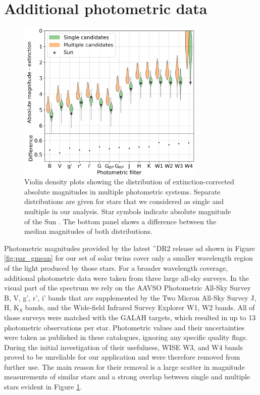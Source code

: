 \section{Additional photometric data}
\label{sec:data_triples}

\begin{figure}
	\centering
	\includegraphics[width=0.8\textwidth]{multimagplotebvc307.png}
	\caption{Violin density plots showing the distribution of extinction-corrected absolute magnitudes in multiple photometric systems. Separate distributions are given for stars that we considered as single and multiple in our analysis. Star symbols indicate absolute magnitude of the Sun \citep{2018ApJS..236...47W}. The bottom panel shows a difference between the median magnitudes of both distributions.}
	\label{fig:viol_photometry}
\end{figure}

Photometric magnitudes provided by the latest \G\ DR2 release \citep{2016A&A...595A...1G, 2018arXiv180409365G} ad shown in Figure \ref{fig:par_gmean} for our set of solar twins cover only a smaller wavelength region of the light produced by those stars. For a broader wavelength coverage, additional photometric data were taken from three large all-sky surveys. In the visual part of the spectrum we rely on the AAVSO Photometric All-Sky Survey \citep[APASS,][]{2015AAS...22533616H} B, V, g', r', i' bands that are supplemented by the Two Micron All-Sky Survey \citep[2MASS,][]{2006AJ....131.1163S} J, H, K$_S$ bands, and the Wide-field Infrared Survey Explorer \citep[WISE,][]{2010AJ....140.1868W} W1, W2 bands. All of those surveys were matched with the GALAH targets, which resulted in up to 13 photometric observations per star. Photometric values and their uncertainties were taken as published in these catalogues, ignoring any specific quality flags. During the initial investigation of their usefulness, WISE W3, and W4 bands proved to be unreliable for our application and were therefore removed from further use. The main reason for their removal is a large scatter in magnitude measurements of similar stars and a strong overlap between single and multiple stars evident in Figure \ref{fig:viol_photometry}.

